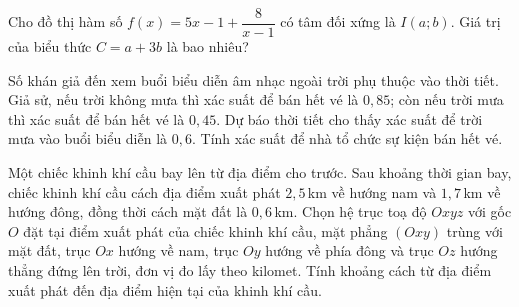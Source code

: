 \begin{ex}
	Cho đồ thị hàm số $f(x)=5x-1+\dfrac{8}{x-1}$ có tâm đối xứng là $I(a;b)$. Giá trị của biểu thức $C=a+3b$ là bao nhiêu?
\end{ex}

\begin{ex}
	Số khán giả đến xem buổi biểu diễn âm nhạc ngoài trời phụ thuộc vào thời tiết. Giả sử, nếu trời không mưa thì xác suất để bán hết vé là $0{,}85$; còn nếu trời mưa thì xác suất để bán hết vé là $0{,}45$. Dự báo thời tiết cho thấy xác suất để trời mưa vào buổi biểu diễn là $0{,}6$. Tính xác suất để nhà tổ chức sự kiện bán hết vé.
\end{ex}

\begin{ex}
	Một chiếc khinh khí cầu bay lên từ địa điểm cho trước. Sau khoảng thời gian bay, chiếc khinh khí cầu cách địa điểm xuất phát $2{,}5$\,km về hướng nam và $1{,}7$\,km về hướng đông, đồng thời cách mặt đất là $0{,}6$\,km. Chọn hệ trục toạ độ $Oxyz$ với gốc $O$ đặt tại điểm xuất phát của chiếc khinh khí cầu, mặt phẳng $(Oxy)$ trùng với mặt đất, trục $Ox$ hướng về nam, trục $Oy$ hướng về phía đông và trục $Oz$ hướng thẳng đứng lên trời, đơn vị đo lấy theo kilomet. Tính khoảng cách từ địa điểm xuất phát đến địa điểm hiện tại của khinh khí cầu.
\end{ex}


